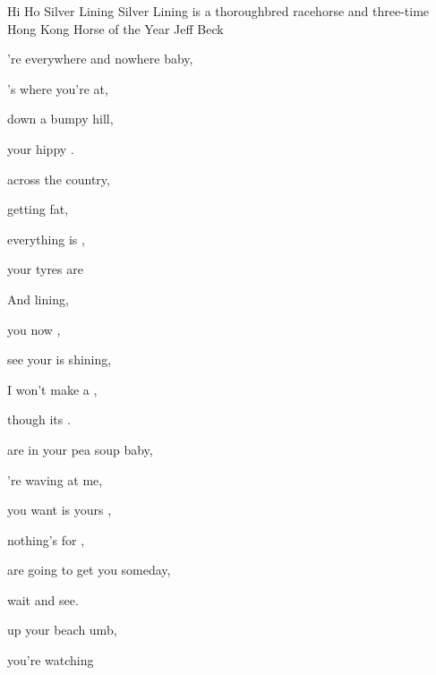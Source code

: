 \begin{SBSong}{Hi Ho Silver Lining}
  {Silver Lining is a thoroughbred racehorse and three-time Hong Kong Horse of the Year}
  {Jeff Beck}
  \begin{SBVerse}
	're everywhere and nowhere baby, 
	
	's where you're at,
	
	 down a bumpy hill,
	
	 your hippy .
	
	 across the country,
	
	 getting fat,
	
	 everything is ,
	
	 your tyres are   
  \end{SBVerse}
  
  \begin{SBChorus}
	And    lining,
	
	 you  now ,
	
	 see your  is shining,
	
	 I won't make a ,
	
	though its . 
  \end{SBChorus}
  \begin{SBVerse}
	 are in your pea soup baby,
	
	're waving at me,
	
	 you want is yours ,
	
	 nothing's for ,
	
	 are going to get you someday,
	
	 wait and see.
	
	 up your beach umb,
	
	 you're watching 
  \end{SBVerse}
\end{SBSong}
